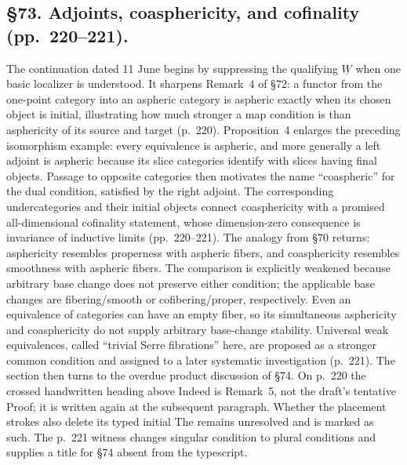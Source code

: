 \documentclass[10pt,oneside]{book}
\begin{document}
\subsection*{\S73. Adjoints, coasphericity, and cofinality (pp.\ 220--221).}
The continuation dated 11 June begins by suppressing the qualifying $\underline W$ when one basic localizer is understood. It sharpens Remark~4 of \S72: a functor from the one-point category into an aspheric category is aspheric exactly when its chosen object is initial, illustrating how much stronger a map condition is than asphericity of its source and target (p.\ 220). Proposition~4 enlarges the preceding isomorphism example: every equivalence is aspheric, and more generally a left adjoint is aspheric because its slice categories identify with slices having final objects. Passage to opposite categories then motivates the name ``coaspheric'' for the dual condition, satisfied by the right adjoint. The corresponding undercategories and their initial objects connect coasphericity with a promised all-dimensional cofinality statement, whose dimension-zero consequence is invariance of inductive limits (pp.\ 220--221). The analogy from \S70 returns: asphericity resembles properness with aspheric fibers, and coasphericity resembles smoothness with aspheric fibers. The comparison is explicitly weakened because arbitrary base change does not preserve either condition; the applicable base changes are fibering/smooth or cofibering/proper, respectively. Even an equivalence of categories can have an empty fiber, so its simultaneous asphericity and coasphericity do not supply arbitrary base-change stability. Universal weak equivalences, called ``trivial Serre fibrations'' here, are proposed as a stronger common condition and assigned to a later systematic investigation (p.\ 221). The section then turns to the overdue product discussion of \S74. On p.\ 220 the crossed handwritten heading above Indeed is Remark~5, not the draft's tentative Proof; it is written again at the subsequent paragraph. Whether the placement strokes also delete its typed initial The remains unresolved and is marked as such. The p.\ 221 witness changes singular condition to plural conditions and supplies a title for \S74 absent from the typescript.
\end{document}
